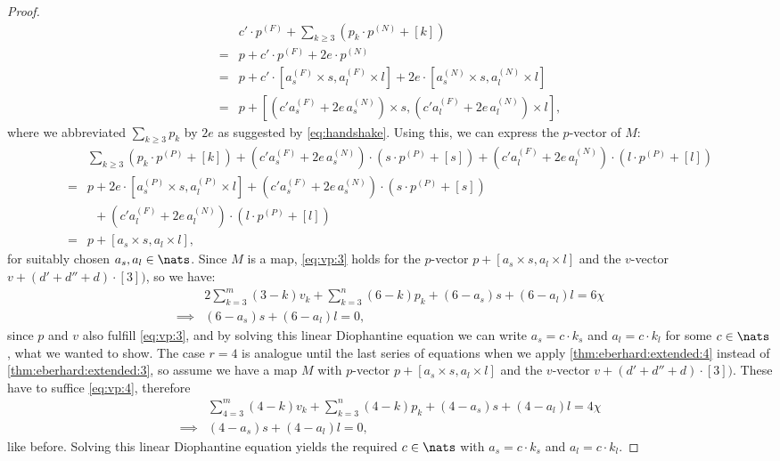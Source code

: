 \begin{proposition}
\begin{proof}
\begin{align*}
      &c' \cdot p^{(F)} + \sum_{k \geq 3} \left(p_k \cdot p^{(N)} + [k]\right)\\
      ={}& p + c' \cdot p^{(F)} + 2e \cdot p^{(N)}\\
      ={}& p + c' \cdot \left[a^{(F)}_s \times s, a^{(F)}_l \times l\right] + 2e \cdot \left[a^{(N)}_s \times s, a^{(N)}_l \times l\right]\\
      ={}& p + \left[\left(c' a^{(F)}_s + 2e \, a^{(N)}_s \right) \times s, \left(c' a^{(F)}_l + 2e\, a^{(N)}_l\right) \times l \right],
    \end{align*}
    where we abbreviated $\sum_{k\geq 3}p_k$ by $2e$ as suggested by \autoref{eq:handshake}. Using this, we can express the $p$-vector of $M$:
    \begin{align*}
      &\sum_{k \geq 3} \left(p_k \cdot p^{(P)} + [k] \right) 
        + \left(c' a^{(F)}_s + 2e \, a^{(N)}_s \right) \cdot \left(s \cdot p^{(P)} + [s] \right)
        + \left(c' a^{(F)}_l + 2e \, a^{(N)}_l \right) \cdot \left(l \cdot p^{(P)} + [l] \right)\\
      ={}&p + 2e \cdot \left[a^{(P)}_s \times s, a^{(P)}_l \times l\right] + \left(c' a^{(F)}_s + 2e \, a^{(N)}_s \right) \cdot \left(s \cdot p^{(P)} + [s] \right)\\     
      &\phantom{p}+ \left(c' a^{(F)}_l + 2e \, a^{(N)}_l \right) \cdot \left(l \cdot p^{(P)} + [l] \right)\\
      ={}&p + [a_s \times s, a_l \times l],
    \end{align*}
    for suitably chosen $a_s, a_l \in \nats$. Since $M$ is a map, \autoref{eq:vp:3} holds for the $p$-vector $p + [a_s \times s, a_l \times l]$ and the $v$-vector $v + (d' + d'' + d) \cdot [3])$, so we have:
    \begin{align*}
      &2 \sum_{k=3}^m \left(3 - k \right) v_k + \sum_{k=3}^n \left(6 - k \right) p_k + (6 - a_s) s + (6 - a_l) l = 6 \chi \\
      \implies & (6 - a_s) s + (6 - a_l) l = 0,
    \end{align*}
    since $p$ and $v$ also fulfill \autoref{eq:vp:3}, and by solving this linear Diophantine equation we can write $a_s = c \cdot k_s$ and $a_l = c \cdot k_l$ for some $c \in \nats$, what we wanted to show. The case $r = 4$ is analogue until the last series of equations when we apply \autoref{thm:eberhard:extended:4} instead of \autoref{thm:eberhard:extended:3}, so assume we have a map $M$ with $p$-vector $p + [a_s \times s, a_l \times l]$ and the $v$-vector $v + (d' + d'' + d) \cdot [3])$. These have to suffice  \autoref{eq:vp:4}, therefore
    \begin{align*}
      &\sum_{4=3}^m \left(4 - k \right) v_k +  \sum_{k=3}^n \left(4 - k \right) p_k + (4 - a_s) s + (4 - a_l) l = 4 \chi\\
      \implies & (4 - a_s) s + (4 - a_l) l = 0,
    \end{align*}
    like before. Solving this linear Diophantine equation yields the required $c \in \nats$ with $a_s = c \cdot k_s$ and $a_l = c \cdot k_l$.
  \end{proof}
\end{proposition}

